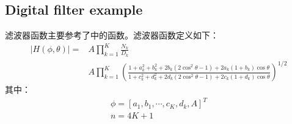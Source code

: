 \documentclass{ctexart}
\begin{document}
\subsection{Digital filter example}
滤波器函数主要参考了\cite{}中的函数。滤波器函数定义如下：
\begin{align}
|H(\phi,\theta)|=&A\prod_{k=1}^{K}{\frac{N_k}{D_k}}\\
		&A\prod_{k=1}^{K}{(\frac{1+a_k^2+b_k^2+2b_k(2\cos^2\theta-1)+2a_k(1+b_k)\cos\theta}{1+c_k^2+d_k^2+2d_k(2\cos^2\theta-1)+2c_k(1+d_k)\cos\theta})^{1/2}}
\end{align}
其中：
\begin{align}
	\phi=[a_1,b_1,\cdots,c_K,d_k,A]^T\\
	n=4K+1
\end{align}
\end{document}
